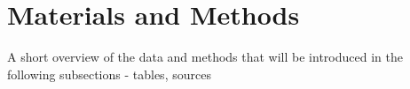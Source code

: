 \section{Materials and Methods}
\label{sec:3-methods}

A short overview of the data and methods that will be introduced in the following subsections - tables, sources \etc







